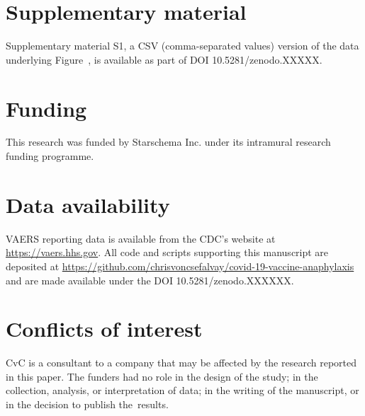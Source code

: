 \documentclass{article}
\begin{document}
\section*{Supplementary material}

Supplementary material S1, a CSV (comma-separated values) version of the data underlying Figure~, is available as part of DOI 10.5281/zenodo.XXXXX.

\section*{Funding}

This research was funded by Starschema Inc. under its intramural research funding programme.

\section*{Data availability}

VAERS reporting data is available from the CDC's website at \url{https://vaers.hhs.gov}.
All code and scripts supporting this manuscript are deposited at
\url{https://github.com/chrisvoncsefalvay/covid-19-vaccine-anaphylaxis} and are made available under the DOI 10.5281/zenodo.XXXXXX.

\section*{Conflicts of interest}

CvC is a consultant to a company that may be affected by the research reported in this paper.
The funders had no role in the design of the study;
in the collection, analysis, or interpretation of data;
in the writing of the manuscript, or in the decision to publish the~results.


\end{document}
